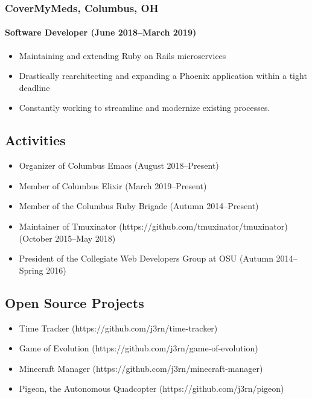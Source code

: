 \documentclass[]{article}
\begin{document}
\subsubsection*{CoverMyMeds, Columbus, OH}
\paragraph*{Software Developer (June 2018--March 2019)}
\begin{itemize}
\item Maintaining and extending Ruby on Rails microservices
\item Drastically rearchitecting and expanding a Phoenix application within a tight deadline
\item Constantly working to streamline and modernize existing processes.
\end{itemize}

\subsection*{Activities}
\begin{itemize}
\item Organizer of Columbus Emacs (August 2018--Present)
\item Member of Columbus Elixir (March 2019--Present)
\item Member of the Columbus Ruby Brigade (Autumn 2014--Present)
\item Maintainer of Tmuxinator (https://github.com/tmuxinator/tmuxinator) (October 2015--May 2018)
\item President of the Collegiate Web Developers Group at OSU (Autumn 2014--Spring 2016)
\end{itemize}

\subsection*{Open Source Projects}
\begin{itemize}
\item Time Tracker (https://github.com/j3rn/time-tracker)
\item Game of Evolution (https://github.com/j3rn/game-of-evolution)
\item Minecraft Manager (https://github.com/j3rn/minecraft-manager)
\item Pigeon, the Autonomous Quadcopter (https://github.com/j3rn/pigeon)
\end{itemize}
\end{document}
